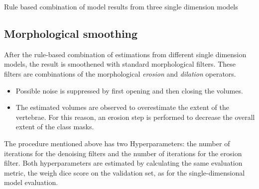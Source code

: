 \begin{algorithm}[H]
    \SetAlgoLined
   \caption{Rule based combination of model results from three single dimension models}
\end{algorithm}


\subsection{Morphological smoothing}
After the rule-based combination of estimations from different single dimension models, the result is smoothened with standard morphological filters.
These filters are combinations of the morphological \textit{erosion} and \textit{dilation} operators.
\begin{itemize}
    \item Possible noise is suppressed by first opening and then closing the volumes.
    \item The estimated volumes are observed to overestimate the extent of the vertebrae. For this reason, an erosion step is performed to decrease the overall extent of the class masks.
\end{itemize}

The procedure mentioned above has two Hyperparameters: the number of iterations for the denoising filters and the number of iterations for the erosion filter.
Both hyperparameters are estimated by calculating the same evaluation metric, the weigh dice score on the validation set, as for the single-dimensional model evaluation. 


